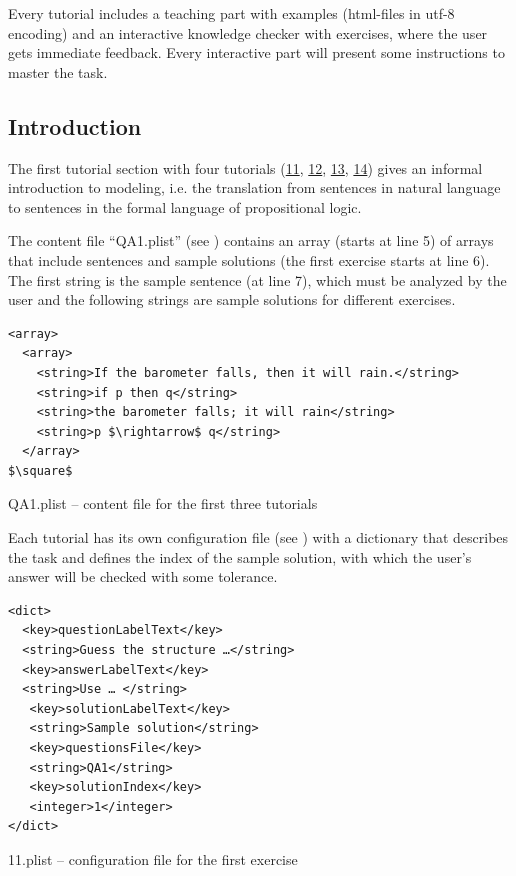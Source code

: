 Every tutorial includes a teaching part with examples (html-files in utf-8 encoding) 
and an interactive knowledge checker with exercises, 
where the user gets immediate feedback. 
Every interactive part will present some instructions to master the task.

\subsection{Introduction}

The first tutorial section with four tutorials 
(\hyperref[tut:11]{11}, 
\hyperref[tut:12]{12}, 
\hyperref[tut:13]{13},
\hyperref[tut:14]{14}) 
gives an informal introduction to modeling, 
i.e. the translation from sentences in natural language to sentences in the formal language of propositional logic.

The content file “QA1.plist” (see ) contains
an array (starts at line 5) 
of arrays that include sentences and sample solutions 
(the first exercise starts at line 6). 
The first string is the sample sentence (at line 7), 
which must be analyzed by the user
and the following strings are sample solutions for different exercises. 

\begin{table}[htdp]
\begin{center}
\begin{lstlisting}[firstnumber=5]
<array>
  <array> 
    <string>If the barometer falls, then it will rain.</string>
    <string>if p then q</string>
    <string>the barometer falls; it will rain</string>
    <string>p $\rightarrow$ q</string>
  </array>
$\square$
\end{lstlisting}
\caption{QA1.plist – content file for the first three tutorials}
\label{tab:QA1PLIST}
\end{center}
\end{table}%

Each tutorial has its own configuration file 
(see )
with a dictionary that
describes the task and defines the index of the sample solution,
with which the user's answer will be checked with some tolerance.

\begin{table}[htdp]
\begin{center}
\begin{lstlisting}[firstnumber=5]
<dict>
  <key>questionLabelText</key>
  <string>Guess the structure …</string>
  <key>answerLabelText</key>
  <string>Use … </string>
   <key>solutionLabelText</key>
   <string>Sample solution</string>
   <key>questionsFile</key>
   <string>QA1</string>
   <key>solutionIndex</key>
   <integer>1</integer>
</dict>
\end{lstlisting}
\caption{11.plist – configuration file for the first exercise}
\label{tab:11PLIST}
\end{center}
\end{table}%

